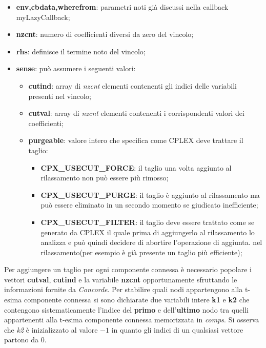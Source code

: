 \documentclass[11pt]{article}
\begin{document}
\begin{itemize}
    \item \textbf{env,cbdata,wherefrom}: parametri noti già discussi nella callback myLazyCallback;
    \item \textbf{nzcnt}: numero di coefficienti diversi da zero del vincolo;
    \item \textbf{rhs}: definisce il termine noto del vincolo;
    \item \textbf{sense}: può assumere i seguenti valori:
    
    \begin{itemize}
    \item \textbf{cutind}: array di \textit{nzcnt} elementi contenenti gli indici delle variabili presenti nel vincolo;
    \item \textbf{cutval}: array di \textit{nzcnt} elementi contenenti i corrispondenti valori dei coefficienti;
    \item \textbf{purgeable}: valore intero che specifica come CPLEX deve trattare il taglio:
    
        \begin{itemize}
        \item \textbf{CPX\_USECUT\_FORCE}: il taglio una volta aggiunto al rilassamento non può essere più rimosso;
        \item \textbf{CPX\_USECUT\_PURGE}: il taglio è aggiunto al rilassamento ma può essere eliminato in un secondo momento se giudicato inefficiente;
        \item \textbf{CPX\_USECUT\_FILTER}: il taglio deve essere trattato come se generato da CPLEX il quale prima di aggiungerlo al rilassamento lo analizza e può quindi decidere di abortire l'operazione di aggiunta.
        nel rilassamento(per esempio è già presente un taglio più efficiente);
        \end{itemize}
    \end{itemize}
\end{itemize}

Per aggiungere un taglio per ogni componente connessa è necessario popolare i vettori \textbf{cutval}, \textbf{cutind} e la variabile \textbf{nzcnt} opportunamente sfruttando le informazioni fornite da \textit{Concorde}. Per stabilire quali nodi appartengono alla t-esima componente connessa si sono dichiarate due variabili intere \textbf{k1} e \textbf{k2} che contengono sistematicamente l'indice del \textbf{primo} e dell'\textbf{ultimo} nodo tra quelli appartenenti alla t-esima componente connessa memorizzata in \textit{comps}. Si osserva che \textit{k2} è inizializzato al valore \textbf{$-1$} in quanto gli indici di un qualsiasi vettore partono da $0$.
\end{document}
